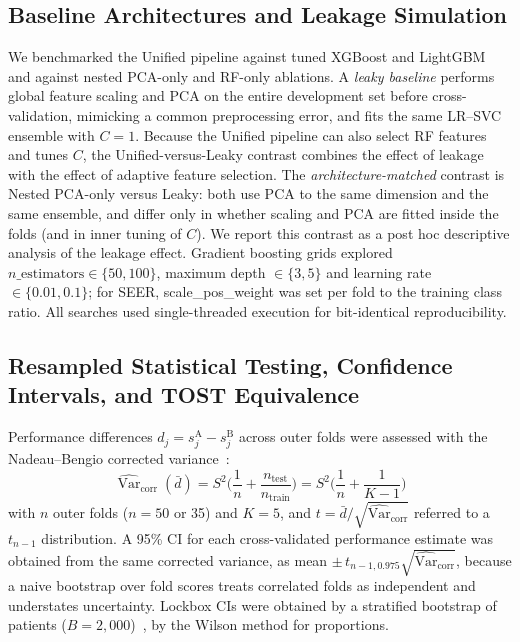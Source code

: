 \documentclass[11pt,a4paper]{article}
\begin{document}
\subsection{Baseline Architectures and Leakage Simulation}\label{sec:baseline-architectures-and-lea}
We benchmarked the Unified pipeline against tuned XGBoost and LightGBM and against nested PCA-only and RF-only ablations. A \emph{leaky baseline} performs global feature scaling and PCA on the entire development set before cross-validation, mimicking a common preprocessing error, and fits the same LR--SVC ensemble with $C=1$. Because the Unified pipeline can also select RF features and tunes $C$, the Unified-versus-Leaky contrast combines the effect of leakage with the effect of adaptive feature selection. The \emph{architecture-matched} contrast is Nested PCA-only versus Leaky: both use PCA to the same dimension and the same ensemble, and differ only in whether scaling and PCA are fitted inside the folds (and in inner tuning of $C$). We report this contrast as a post hoc descriptive analysis of the leakage effect. Gradient boosting grids explored $n\_\text{estimators}\in\{50,100\}$, maximum depth $\in\{3,5\}$ and learning rate $\in\{0.01,0.1\}$; for SEER, scale\_pos\_weight was set per fold to the training class ratio. All searches used single-threaded execution for bit-identical reproducibility.

\subsection{Resampled Statistical Testing, Confidence Intervals, and TOST Equivalence}\label{sec:resampled-statistical-testing-}
Performance differences $d_j=s_j^{\text{A}}-s_j^{\text{B}}$ across outer folds were assessed with the Nadeau--Bengio corrected variance~\cite{nadeau2003}:
\begin{equation}
\widehat{\operatorname{Var}}_{\text{corr}}(\bar{d})=S^2\Big(\frac{1}{n}+\frac{n_{\text{test}}}{n_{\text{train}}}\Big)=S^2\Big(\frac{1}{n}+\frac{1}{K-1}\Big)
\end{equation}
with $n$ outer folds ($n=50$ or 35) and $K=5$, and $t=\bar{d}/\sqrt{\widehat{\operatorname{Var}}_{\text{corr}}}$ referred to a $t_{n-1}$ distribution. A 95\% CI for each cross-validated performance estimate was obtained from the same corrected variance, as mean $\pm\,t_{n-1,0.975}\sqrt{\widehat{\operatorname{Var}}_{\text{corr}}}$, because a naive bootstrap over fold scores treats correlated folds as independent and understates uncertainty. Lockbox CIs were obtained by a stratified bootstrap of patients ($B=2{,}000$)~\cite{efron1993}, by the Wilson method for proportions.
\end{document}
